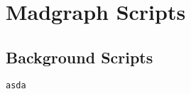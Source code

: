 \chapter{Madgraph Scripts}

\section{Background Scripts}
\begin{lstlisting}[language=Python]
asda
\end{lstlisting}
\lipsum